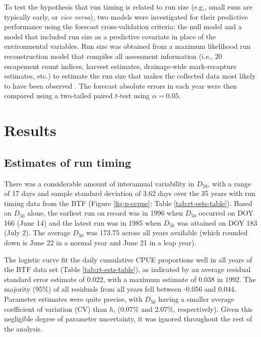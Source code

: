\documentclass[12pt,]{book}
\theoremstyle{definition}
\theoremstyle{definition}
\theoremstyle{definition}
\theoremstyle{remark}
\begin{document}
\noindent
To test the hypothesis that run timing is related to run size (e.g.,
small runs are typically early, or \emph{vice versa}), two models were
investigated for their predictive performance using the forecast
cross-validation criteria: the null model and a model that included run
size as a predictive covariate in place of the environmental variables.
Run size was obtained from a maximum likelihood run reconstruction model
that compiles all assessment information (i.e., 20 escapement count
indices, harvest estimates, drainage-wide mark-recapture estimates,
etc.) to estimate the run size that makes the collected data most likely
to have been observed \citep{liller-etal-2018, bue-etal-2012}. The
forecast absolute errors in each year were then compared using a
two-tailed paired \(t\)-test using \(\alpha = 0.05\).

\section{Results}\label{results}

\subsection{Estimates of run timing}\label{estimates-of-run-timing}

\noindent
There was a considerable amount of interannual variability in
\(D_{50}\), with a range of 17 days and sample standard deviation of
3.62 days over the 35 years with run timing data from the BTF (Figure
\ref{fig:p-ccpue}; Table \ref{tab:rt-ests-table}). Based on \(D_{50}\)
alone, the earliest run on record was in 1996 when \(D_{50}\) occurred
on DOY 166 (June 14) and the latest run was in 1985 when \(D_{50}\) was
attained on DOY 183 (July 2). The average \(D_{50}\) was 173.75 across
all years available (which rounded down is June 22 in a normal year and
June 21 in a leap year).

The logistic curve fit the daily cumulative CPUE proportions well in all
years of the BTF data set (Table \ref{tab:rt-ests-table}), as indicated
by an average residual standard error estimate of 0.022, with a maximum
estimate of 0.038 in 1992. The majority (95\%) of all residuals from all
years fell between -0.056 and 0.044. Parameter estimates were quite
precise, with \(D_{50}\) having a smaller average coefficient of
variation (CV) than \(h\), (0.07\% and 2.07\%, respectively). Given this
negligible degree of parameter uncertainty, it was ignored throughout
the rest of the analysis.
\end{document}
